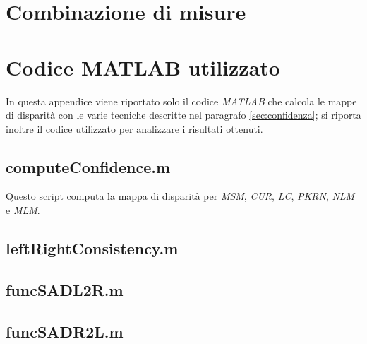 \documentclass[12pt]{report}
\newcommand{\nullpage}{\newpage\null\thispagestyle{empty}}  %
\begin{document}
				


	
	\chapter{Combinazione di misure}
	\label{sec:combinazione}
	\pagestyle{fancy}
				

	
	
	
	\nullpage	
	\appendix 
	
	\chapter{Codice MATLAB utilizzato}
	\label{sec:codice}
	
		In questa appendice viene riportato solo il codice \textit{MATLAB} che calcola le mappe di disparità con le varie tecniche descritte nel paragrafo \ref{sec:confidenza}; si riporta inoltre il codice utilizzato per analizzare i risultati ottenuti.
	
		\section{computeConfidence.m}
		\label{sec:computeConfidence}
		
			Questo script computa la mappa di disparità per \textit{MSM}, \textit{CUR}, \textit{LC}, \textit{PKRN}, \textit{NLM} e \textit{MLM}.
	
			
		
		\newpage
		\section{leftRightConsistency.m}
		\label{sec:leftRightConsistency}
				
			
		\newpage
		\section{funcSADL2R.m}
		\label{sec:funcSADL2R}
			
			
		\newpage
		\section{funcSADR2L.m}
		\label{sec:funcSADR2L}
					
\end{document}
